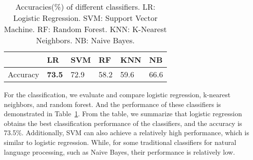 \begin{table}[]
\centering
\begin{tabular}{|l|l|l|l|l|l|}
\hline
         & LR            & SVM  & RF   & KNN   & NB   \\ \hline
Accuracy & \textbf{73.5} & 72.9 & 58.2 & 59.6  & 66.6 \\ \hline
\end{tabular}
\caption{Accuracies(\%) of different classifiers. LR: Logistic Regression. SVM: Support Vector Machine. RF: Random Forest. KNN: K-Nearest Neighbors. NB: Naive Bayes.}
\label{tab:classifier}
\end{table}

For the classification, we evaluate and compare logistic regression, k-nearest neighbors, and random forest. And the performance of these classifiers is demonstrated in Table~\ref{tab:classifier}. From the table, we summarize that logistic regression obtains the best classification performance of the classifiers, and the accuracy is 73.5\%. Additionally, SVM can also achieve a relatively high performance, which is similar to logistic regression. While, for some traditional classifiers for natural language processing, such as Naive Bayes, their performance is relatively low.


